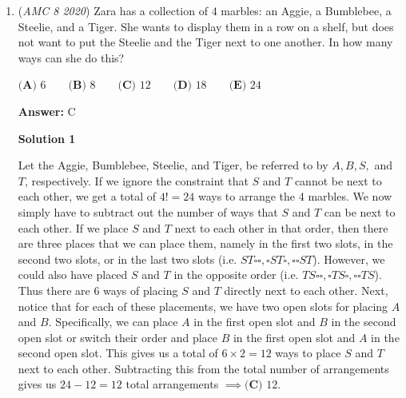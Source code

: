 \begin{enumerate}
 



\textbf{Solution 4 (For Rubik's Cubers)}

On a $4$x$4$ Rubik's cube, there are exactly $24$'edge' pieces, $8$ 'corners', and $24$ 'center' pieces. Edge pieces have $2$ frosted faces (the ones on the bottom only have one, corners have $3$ frosted faces, and centers have $1$. So since we have $24$ edges pieces, we subtract the $8$ 'edge' pieces on the bottom (they only have one frosted face), and then we add the $4$ bottom 'corner' pieces (they also have frosted faces). we get $24-8+4=\boxed{\textbf{(D) }20}$.

 -Solution by MismatchedCubing and Andrew\_Lu

 


	\item (\textit{AMC 8 2020}) Zara has a collection of $4$ marbles: an Aggie, a Bumblebee, a Steelie, and a Tiger. She wants to display them in a row on a shelf, but does not want to put the Steelie and the Tiger next to one another. In how many ways can she do this?


 $\textbf{(A) }6 \qquad \textbf{(B) }8 \qquad \textbf{(C) }12 \qquad \textbf{(D) }18 \qquad \textbf{(E) }24$

 \textbf{Answer: }C



\textbf{Solution 1}

Let the Aggie, Bumblebee, Steelie, and Tiger, be referred to by $A,B,S,$ and $T$, respectively. If we ignore the constraint that $S$ and $T$ cannot be next to each other, we get a total of $4!=24$ ways to arrange the 4 marbles. We now simply have to subtract out the number of ways that $S$ and $T$ can be next to each other. If we place $S$ and $T$ next to each other in that order, then there are three places that we can place them, namely in the first two slots, in the second two slots, or in the last two slots (i.e. $ST\square\square, \square ST\square, \square\square ST$). However, we could also have placed $S$ and $T$ in the opposite order (i.e. $TS\square\square, \square TS\square, \square\square TS$). Thus there are 6 ways of placing $S$ and $T$ directly next to each other. Next, notice that for each of these placements, we have two open slots for placing $A$ and $B$. Specifically, we can place $A$ in the first open slot and $B$ in the second open slot or switch their order and place $B$ in the first open slot and $A$ in the second open slot. This gives us a total of $6\times 2=12$ ways to place $S$ and $T$ next to each other. Subtracting this from the total number of arrangements gives us $24-12=12$ total arrangements $\implies\boxed{\textbf{(C) }12}$.



\end{enumerate}
